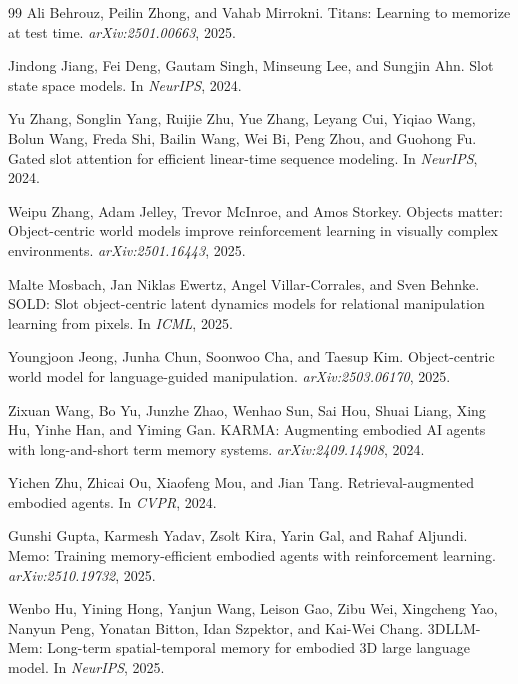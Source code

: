 \begin{thebibliography}{99}
Ali Behrouz, Peilin Zhong, and Vahab Mirrokni.
\newblock Titans: Learning to memorize at test time.
\newblock \emph{arXiv:2501.00663}, 2025.

Jindong Jiang, Fei Deng, Gautam Singh, Minseung Lee, and Sungjin Ahn.
\newblock Slot state space models.
\newblock In \emph{NeurIPS}, 2024.

Yu Zhang, Songlin Yang, Ruijie Zhu, Yue Zhang, Leyang Cui, Yiqiao Wang, Bolun
Wang, Freda Shi, Bailin Wang, Wei Bi, Peng Zhou, and Guohong Fu.
\newblock Gated slot attention for efficient linear-time sequence modeling.
\newblock In \emph{NeurIPS}, 2024.

Weipu Zhang, Adam Jelley, Trevor McInroe, and Amos Storkey.
\newblock Objects matter: Object-centric world models improve reinforcement
learning in visually complex environments.
\newblock \emph{arXiv:2501.16443}, 2025.

Malte Mosbach, Jan Niklas Ewertz, Angel Villar-Corrales, and Sven Behnke.
\newblock SOLD: Slot object-centric latent dynamics models for relational
manipulation learning from pixels.
\newblock In \emph{ICML}, 2025.

Youngjoon Jeong, Junha Chun, Soonwoo Cha, and Taesup Kim.
\newblock Object-centric world model for language-guided manipulation.
\newblock \emph{arXiv:2503.06170}, 2025.

Zixuan Wang, Bo Yu, Junzhe Zhao, Wenhao Sun, Sai Hou, Shuai Liang, Xing Hu,
Yinhe Han, and Yiming Gan.
\newblock KARMA: Augmenting embodied AI agents with long-and-short term
memory systems.
\newblock \emph{arXiv:2409.14908}, 2024.

Yichen Zhu, Zhicai Ou, Xiaofeng Mou, and Jian Tang.
\newblock Retrieval-augmented embodied agents.
\newblock In \emph{CVPR}, 2024.

Gunshi Gupta, Karmesh Yadav, Zsolt Kira, Yarin Gal, and Rahaf Aljundi.
\newblock Memo: Training memory-efficient embodied agents with reinforcement
learning.
\newblock \emph{arXiv:2510.19732}, 2025.

Wenbo Hu, Yining Hong, Yanjun Wang, Leison Gao, Zibu Wei, Xingcheng Yao,
Nanyun Peng, Yonatan Bitton, Idan Szpektor, and Kai-Wei Chang.
\newblock 3DLLM-Mem: Long-term spatial-temporal memory for embodied 3D large
language model.
\newblock In \emph{NeurIPS}, 2025.


\end{thebibliography}
